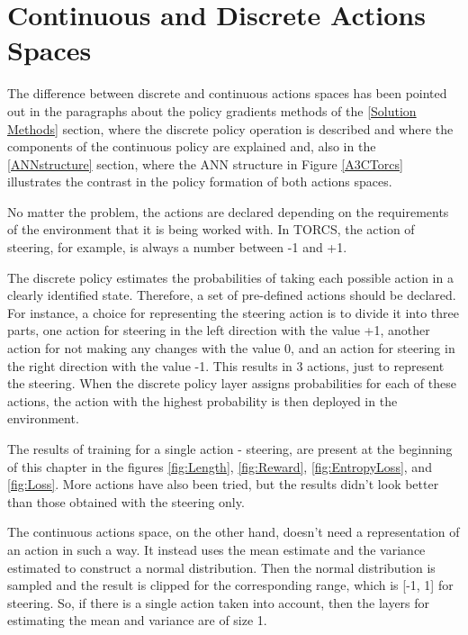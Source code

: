 \section{Continuous and Discrete Actions Spaces}
The difference between discrete and continuous actions spaces has been pointed out in the paragraphs about the policy gradients methods of the \ref{Solution Methods} section, where the discrete policy operation is described and where the components of the continuous policy are explained and, also in the \ref{ANNstructure} section, where the ANN structure in Figure \ref{A3CTorcs} illustrates the contrast in the policy formation of both actions spaces.

No matter the problem, the actions are declared depending on the requirements of the environment that it is being worked with. In TORCS, the action of steering, for example, is always a number between -1 and +1.

The discrete policy estimates the probabilities of taking each possible action in a clearly identified state. Therefore, a set of pre-defined actions should be declared. For instance, a choice for representing the steering action is to divide it into three parts, one action for steering in the left direction with the value +1, another action for not making any changes with the value 0, and an action for steering in the right direction with the value -1. This results in 3 actions, just to represent the steering. When the discrete policy layer assigns probabilities for each of these actions, the action with the highest probability is then deployed in the environment.

The results of training for a single action - steering, are present at the beginning of this chapter in the figures \ref{fig:Length}, \ref{fig:Reward}, \ref{fig:EntropyLoss}, and \ref{fig:Loss}. More actions have also been tried, but the results didn't look better than those obtained with the steering only.

The continuous actions space, on the other hand, doesn't need a representation of an action in such a way. It instead uses the mean estimate and the variance estimated to construct a normal distribution. Then the normal distribution is sampled and the result is clipped for the corresponding range, which is [-1, 1] for steering. So, if there is a single action taken into account, then the layers for estimating the mean and variance are of size 1.

